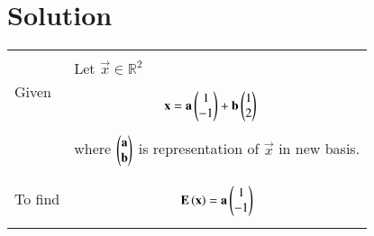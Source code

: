 \documentclass[journal,12pt]{IEEEtran}
\begin{document}
\section{\textbf{Solution}}
\renewcommand{\thetable}{1}
\begin{longtable}{|p{4cm}|p{14cm}|}
\hline
\multirow{3}{*}{Given} 
    	& \\
     	&  Let $\vec{x} \in \mathbb{R}^{2}$\\
     	&{\begin{align}\label{eq1}
     	& \mathbf{x} = \mathbf{a}\begin{pmatrix}1\\-1\end{pmatrix} +\mathbf{b}\begin{pmatrix}1\\2\end{pmatrix}
     	\end{align}}\\
     	& where $\begin{pmatrix}\mathbf{a}\\\mathbf{b}\end{pmatrix}$ is representation of $\vec{x}$ in new basis.\\
\hline
\multirow{3}{*}{To find} 
     	&\\
        &
        {\begin{align}\label{eq2}
        \mathbf{E} \left(\mathbf{x}\right) = \mathbf{a}\begin{pmatrix}1\\-1\end{pmatrix}
        \end{align}}\\
     	

\end{longtable}
\end{document}
